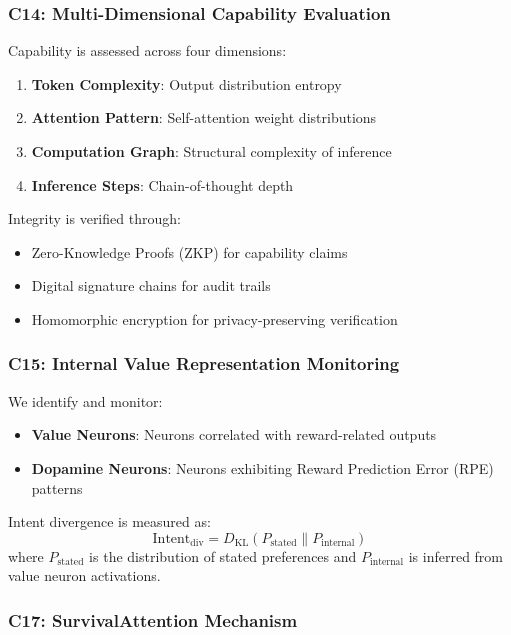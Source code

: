 \documentclass[11pt,a4paper]{article}
\newcommand{\DKL}{D_{\text{KL}}}
\begin{document}
\subsubsection{C14: Multi-Dimensional Capability Evaluation}

Capability is assessed across four dimensions:
\begin{enumerate}
    \item \textbf{Token Complexity}: Output distribution entropy
    \item \textbf{Attention Pattern}: Self-attention weight distributions
    \item \textbf{Computation Graph}: Structural complexity of inference
    \item \textbf{Inference Steps}: Chain-of-thought depth
\end{enumerate}

Integrity is verified through:
\begin{itemize}
    \item Zero-Knowledge Proofs (ZKP) for capability claims
    \item Digital signature chains for audit trails
    \item Homomorphic encryption for privacy-preserving verification
\end{itemize}

\subsubsection{C15: Internal Value Representation Monitoring}

We identify and monitor:
\begin{itemize}
    \item \textbf{Value Neurons}: Neurons correlated with reward-related outputs
    \item \textbf{Dopamine Neurons}: Neurons exhibiting Reward Prediction Error (RPE) patterns
\end{itemize}

Intent divergence is measured as:
\begin{equation}
\text{Intent}_{\text{div}} = \DKL(P_{\text{stated}} \| P_{\text{internal}})
\end{equation}
where $P_{\text{stated}}$ is the distribution of stated preferences and $P_{\text{internal}}$ is inferred from value neuron activations.

\subsubsection{C17: SurvivalAttention Mechanism}
\end{document}
